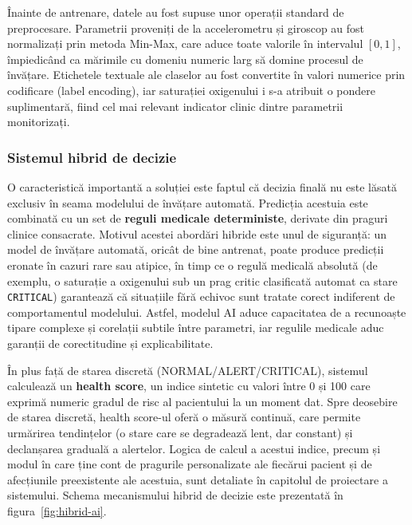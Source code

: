\documentclass[12pt,a4paper]{article}
\begin{document}
Înainte de antrenare, datele au fost supuse unor operații standard de preprocesare. Parametrii proveniți de la accelerometru și giroscop au fost normalizați prin metoda Min-Max, care aduce toate valorile în intervalul $[0, 1]$, împiedicând ca mărimile cu domeniu numeric larg să domine procesul de învățare. Etichetele textuale ale claselor au fost convertite în valori numerice prin codificare (label encoding), iar saturației oxigenului i s-a atribuit o pondere suplimentară, fiind cel mai relevant indicator clinic dintre parametrii monitorizați.

\subsubsection{Sistemul hibrid de decizie}

O caracteristică importantă a soluției este faptul că decizia finală nu este lăsată exclusiv în seama modelului de învățare automată. Predicția acestuia este combinată cu un set de \textbf{reguli medicale deterministe}, derivate din praguri clinice consacrate. Motivul acestei abordări hibride este unul de siguranță: un model de învățare automată, oricât de bine antrenat, poate produce predicții eronate în cazuri rare sau atipice, în timp ce o regulă medicală absolută (de exemplu, o saturație a oxigenului sub un prag critic clasificată automat ca stare \texttt{CRITICAL}) garantează că situațiile fără echivoc sunt tratate corect indiferent de comportamentul modelului. Astfel, modelul AI aduce capacitatea de a recunoaște tipare complexe și corelații subtile între parametri, iar regulile medicale aduc garanții de corectitudine și explicabilitate.

În plus față de starea discretă (NORMAL/ALERT/CRITICAL), sistemul calculează un \textbf{health score}, un indice sintetic cu valori între 0 și 100 care exprimă numeric gradul de risc al pacientului la un moment dat. Spre deosebire de starea discretă, health score-ul oferă o măsură continuă, care permite urmărirea tendințelor (o stare care se degradează lent, dar constant) și declanșarea graduală a alertelor. Logica de calcul a acestui indice, precum și modul în care ține cont de pragurile personalizate ale fiecărui pacient și de afecțiunile preexistente ale acestuia, sunt detaliate în capitolul de proiectare a sistemului. Schema mecanismului hibrid de decizie este prezentată în figura~\ref{fig:hibrid-ai}.
\end{document}
